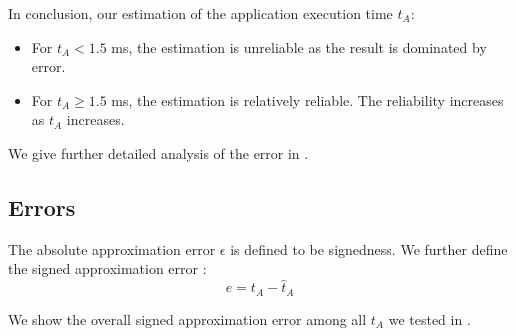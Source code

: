 In conclusion, our estimation of the application execution time $t_A$:
\begin{itemize}
	\item For $t_A < 1.5$ ms, the estimation is unreliable as the result is dominated by error.
	\item For $t_A \geq 1.5$ ms, the estimation is relatively reliable. The reliability increases as $t_A$ increases.
\end{itemize}

We give further detailed analysis of the error in .

\subsection{Errors} \label{ta error}

The absolute approximation error $\epsilon$ is defined to be signedness. We further define the signed approximation error :
\begin{equation} \label{Eq: e}
e = t_A - \hat{t}_A
\end{equation}

We show the overall signed approximation error among all $t_A$ we tested in .

